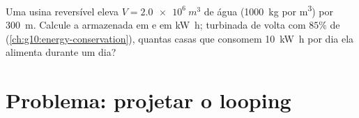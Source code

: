 \begin{exercise}[$\star\star\star$]\label{exo:g11:mechanical-energy:15}
Uma usina reversível eleva $V = \qty{2.0e6}{m^3}$ de água
(\qty{1000}{kg} por \unit{m^3}) por \qty{300}{m}. Calcule a 
armazenada em  e em \unit{kW.h}; turbinada de volta com $85\%$ de
 (\cref{ch:g10:energy-conservation}), quantas casas que
consomem \qty{10}{kW.h} por dia ela alimenta durante um dia?
\end{exercise}

\section{Problema: projetar o looping}

